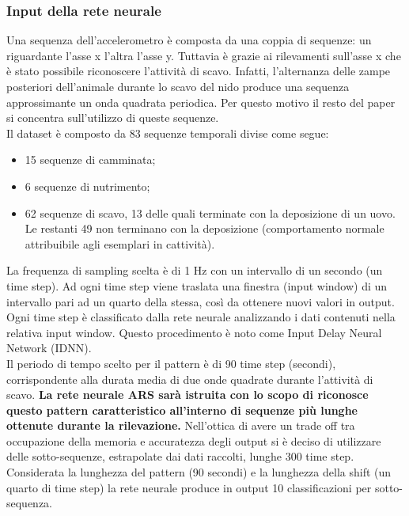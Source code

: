 \documentclass[12pt]{article}
\begin{document}
 			\subsubsection{Input della rete neurale}
 				Una sequenza dell'accelerometro è composta da una coppia di sequenze: un riguardante l'asse x l'altra l'asse y. Tuttavia è grazie ai rilevamenti sull'asse x che è stato possibile riconoscere l'attività di scavo. Infatti, l'alternanza delle zampe posteriori dell'animale durante lo scavo del nido produce una sequenza approssimante un onda quadrata periodica. Per questo motivo il resto del paper si concentra sull'utilizzo di queste sequenze.\\
 				Il dataset è composto da 83 sequenze temporali divise come segue:
 				\begin{itemize}
 					\item 15 sequenze di camminata;
 					\item 6 sequenze di nutrimento;
 					\item 62 sequenze di scavo, 13 delle quali terminate con la deposizione di un uovo. Le restanti 49 non terminano con la deposizione (comportamento normale attribuibile agli esemplari in cattività).
 				\end{itemize}
 				La frequenza di sampling scelta è di 1 Hz con un intervallo di un secondo (un time step). Ad ogni time step viene traslata una finestra (input window) di un intervallo pari ad un quarto della stessa, così da ottenere nuovi valori in output. Ogni time step è classificato dalla rete neurale analizzando i dati contenuti nella relativa input window. Questo procedimento è noto come Input Delay Neural Network (IDNN).\\
 				Il periodo di tempo scelto per il pattern è di 90 time step (secondi), corrispondente alla durata media di due onde quadrate durante l'attività di scavo. \textbf{La rete neurale ARS sarà istruita con lo scopo di riconosce questo pattern caratteristico all'interno di sequenze più lunghe ottenute durante la rilevazione.} Nell'ottica di avere un trade off tra occupazione della memoria e accuratezza degli output si è deciso di utilizzare delle sotto-sequenze, estrapolate dai dati raccolti, lunghe 300 time step. Considerata la lunghezza del pattern (90 secondi) e la lunghezza della shift (un quarto di time step) la rete neurale produce in output 10 classificazioni per sotto-sequenza.
\end{document}
